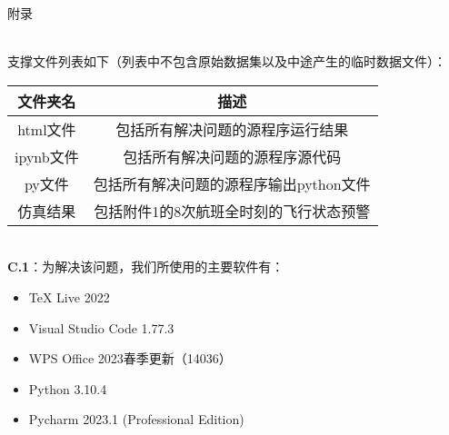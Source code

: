 \documentclass{MathModeling}
\begin{document}
	\newpage


	\begin{center}
		\heiti{} 附\hspace{2pc}录
	\end{center}

	
\newpage
	~\\

	支撑文件列表如下（列表中不包含原始数据集以及中途产生的临时数据文件）：

\begin{table}[H]
	\centering
	  \begin{tabular}{cc}
	  \toprule
	  \textbf{文件夹名} & \textbf{描述} \\
	  \midrule
	  html文件 & 包括所有解决问题的源程序运行结果 \\
	  ipynb文件 & 包括所有解决问题的源程序源代码 \\
	  py文件  & 包括所有解决问题的源程序输出python文件 \\
	  仿真结果  & 包括附件1的8次航班全时刻的飞行状态预警 \\
	  \bottomrule
	  \end{tabular}
\end{table}

	~\\

	\textbf{C.1}：为解决该问题，我们所使用的主要软件有：
	\begin{itemize}
		\item TeX Live 2022
		\item Visual Studio Code 1.77.3
		\item WPS Office 2023春季更新（14036）
		\item Python 3.10.4
		\item Pycharm 2023.1 (Professional Edition)
	\end{itemize}
\end{document}
